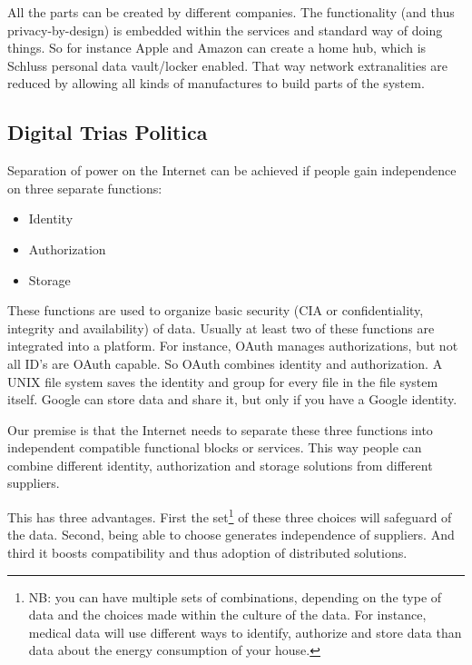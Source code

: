 \documentclass{article}
\begin{document}
All the parts can be created by different companies. The functionality (and thus privacy-by-design) is embedded within the services and standard way of doing things. So for instance Apple and Amazon can create a home hub, which is Schluss personal data vault/locker enabled. That way network extranalities are reduced by allowing all kinds of manufactures to build parts of the system.

\subsection{Digital Trias Politica}
Separation of power on the Internet can be achieved if people gain independence on three separate functions:

\begin{itemize}
    \item Identity
    \item Authorization
    \item Storage
\end{itemize}

These functions are used to organize basic security (CIA or confidentiality, integrity and availability) of data. Usually at least two of these functions are integrated into a platform. For instance, OAuth manages authorizations, but not all ID's are OAuth capable. So OAuth combines identity and authorization. A UNIX file system saves the identity and group for every file in the file system itself. Google can store data and share it, but only if you have a Google identity. 

Our premise is that the Internet needs to separate these three functions into independent compatible functional blocks or services. This way people can combine different identity, authorization and storage solutions from different suppliers.

This has three advantages. First the set\footnote{NB: you can have multiple sets of combinations, depending on the type of data and the choices made within the culture of the data. For instance, medical data will use different ways to identify, authorize and store data than data about the energy consumption of your house.} of these three choices will safeguard of the data. Second, being able to choose generates independence of suppliers. And third it boosts compatibility and thus adoption of distributed solutions.

\end{document}
